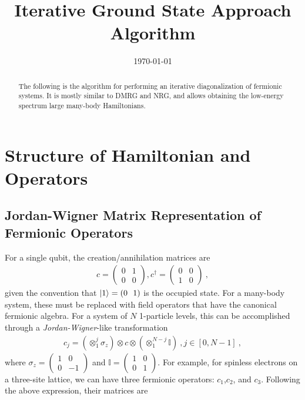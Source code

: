 \documentclass[reprint]{revtex4-2}
\begin{document}
\title{Iterative Ground State Approach Algorithm}
\begin{abstract}
	The following is the algorithm for performing an iterative diagonalization of fermionic systems. It is mostly similar to DMRG and NRG, and allows obtaining the low-energy spectrum large many-body Hamiltonians.
\end{abstract}
\date{\today}
\maketitle

% 

\section{Structure of Hamiltonian and Operators}
\subsection{Jordan-Wigner Matrix Representation of Fermionic Operators}
For a single qubit, the creation/annihilation matrices are
\begin{equation}\begin{aligned}
	c = \begin{pmatrix}0 & 1 \\ 0 & 0\end{pmatrix}, c^\dagger = \begin{pmatrix}0 & 0 \\ 1 & 0\end{pmatrix}~,
\end{aligned}\end{equation}
given the convention that \(\ket{1} = (0 ~ ~ 1)\) is the occupied state. For a many-body system, these must be replaced with field operators that have the canonical fermionic algebra. For a system of \(N\) 1-particle levels, this can be accomplished through a {\it Jordan-Wigner}-like transformation
\begin{equation}\begin{aligned}
	c_j = \left(\otimes_1^j \sigma_z\right) \otimes c \otimes \left(\otimes_1^{N-j} \mathbb{I}\right) ~, j \in [0, N-1]~,
\end{aligned}\end{equation}
where \(\sigma_z = \begin{pmatrix} 1 & 0 \\ 0 & -1 \end{pmatrix} \) and \(\mathbb{I} = \begin{pmatrix} 1 & 0 \\ 0 & 1 \end{pmatrix} \). For example, for spinless electrons on a three-site lattice, we can have three fermionic operators: \(c_{1}\),\(c_{2}\), and \(c_{3}\). Following the above expression, their matrices are\\
\end{document}
